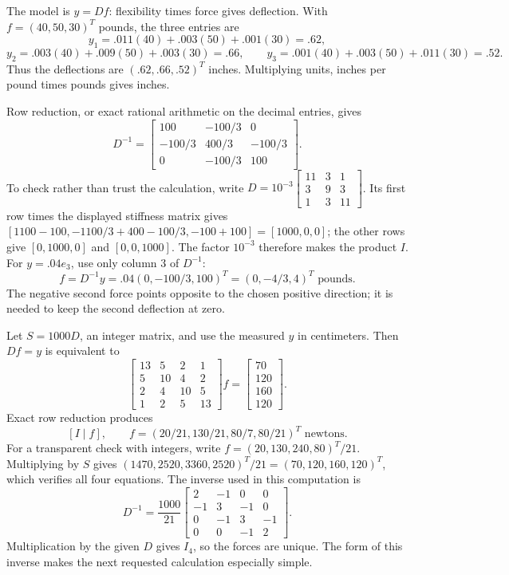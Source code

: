 The model is $y=Df$: flexibility times force gives deflection.
With $f=(40,50,30)^T$ pounds, the three entries are
\[
 y_1=.011(40)+.003(50)+.001(30)=.62,
\]
\[
 y_2=.003(40)+.009(50)+.003(30)=.66,\qquad
 y_3=.001(40)+.003(50)+.011(30)=.52.
\]
Thus the deflections are $\boxed{(.62,.66,.52)^T}$ inches.
Multiplying units, inches per pound times pounds gives inches.

Row reduction, or exact rational arithmetic on the decimal entries, gives
\[
 D^{-1}=\begin{bmatrix}100&-100/3&0\\-100/3&400/3&-100/3\\0&-100/3&100\end{bmatrix}.
\]
To check rather than trust the calculation, write
$D=10^{-3}\begin{bmatrix}11&3&1\\3&9&3\\1&3&11\end{bmatrix}$.
Its first row times the displayed stiffness matrix gives
$[1100-100, -1100/3+400-100/3, -100+100]=[1000,0,0]$;
the other rows give $[0,1000,0]$ and $[0,0,1000]$. The factor $10^{-3}$
therefore makes the product $I$.
For $y=.04e_3$, use only column 3 of $D^{-1}$:
\[
 f=D^{-1}y=.04(0,-100/3,100)^T=(0,-4/3,4)^T\text{ pounds}.
\]
The negative second force points opposite to the chosen positive direction;
it is needed to keep the second deflection at zero.

Let $S=1000D$, an integer matrix, and use the measured $y$ in centimeters.
Then $Df=y$ is equivalent to
\[
 \begin{bmatrix}13&5&2&1\\5&10&4&2\\2&4&10&5\\1&2&5&13\end{bmatrix}f
 =\begin{bmatrix}70\\120\\160\\120\end{bmatrix}.
\]
Exact row reduction produces
\[
 [I\mid f],\qquad
 \boxed{f=(20/21,130/21,80/7,80/21)^T}\text{ newtons}.
\]
For a transparent check with integers, write
$f=(20,130,240,80)^T/21$. Multiplying by $S$ gives
$(1470,2520,3360,2520)^T/21=(70,120,160,120)^T$,
which verifies all four equations. The inverse used in this computation is
\[
 D^{-1}=\frac{1000}{21}
 \begin{bmatrix}2&-1&0&0\\-1&3&-1&0\\0&-1&3&-1\\0&0&-1&2\end{bmatrix}.
\]
Multiplication by the given $D$ gives $I_4$, so the forces are unique.
The form of this inverse makes the next requested calculation especially simple.

